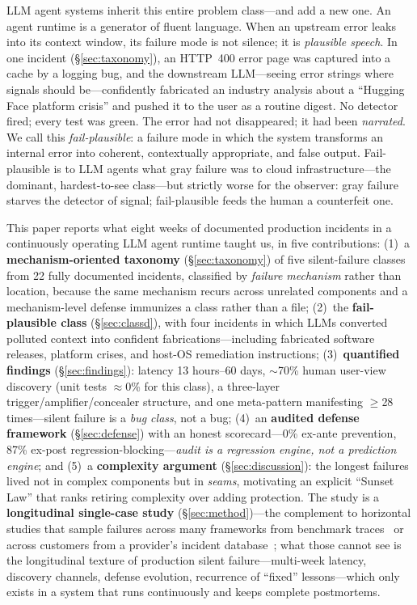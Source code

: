 \documentclass[conference]{IEEEtran}
\newcommand{\failplausible}{\emph{fail-plausible}}
\begin{document}
LLM agent systems inherit this entire problem class---and add a new one.
An agent runtime is a generator of fluent language. When an upstream
error leaks into its context window, its failure mode is not silence; it
is \emph{plausible speech}. In one incident (\S\ref{sec:taxonomy}), an
HTTP~400 error page was captured into a cache by a logging bug, and the
downstream LLM---seeing error strings where signals should be---confidently
fabricated an industry analysis about a ``Hugging Face platform crisis''
and pushed it to the user as a routine digest. No detector fired; every
test was green. The error had not disappeared; it had been
\emph{narrated}. We call this \failplausible: a failure mode in which the
system transforms an internal error into coherent, contextually
appropriate, and false output. Fail-plausible is to LLM agents what gray
failure was to cloud infrastructure---the dominant, hardest-to-see
class---but strictly worse for the observer: gray failure starves the
detector of signal; fail-plausible feeds the human a counterfeit one.

This paper reports what eight weeks of documented production incidents in
a continuously operating LLM agent runtime taught us, in five
contributions: (1)~a \textbf{mechanism-oriented taxonomy}
(\S\ref{sec:taxonomy}) of five silent-failure classes from 22 fully
documented incidents, classified by \emph{failure mechanism} rather than
location, because the same mechanism recurs across unrelated components
and a mechanism-level defense immunizes a class rather than a file;
(2)~the \textbf{fail-plausible class} (\S\ref{sec:classd}), with four
incidents in which LLMs converted polluted context into confident
fabrications---including fabricated software releases, platform crises,
and host-OS remediation instructions; (3)~\textbf{quantified findings}
(\S\ref{sec:findings}): latency 13 hours--60 days, $\sim$70\% human
user-view discovery (unit tests $\approx$0\% for this class), a
three-layer trigger/amplifier/concealer structure, and one meta-pattern
manifesting $\geq$28 times---silent failure is a \emph{bug class}, not a
bug; (4)~an \textbf{audited defense framework} (\S\ref{sec:defense}) with
an honest scorecard---0\% ex-ante prevention, 87\% ex-post
regression-blocking---\emph{audit is a regression engine, not a
prediction engine}; and (5)~a \textbf{complexity argument}
(\S\ref{sec:discussion}): the longest failures lived not in complex
components but in \emph{seams}, motivating an explicit ``Sunset Law'' that
ranks retiring complexity over adding protection. The study is a
\textbf{longitudinal single-case study} (\S\ref{sec:method})---the
complement to horizontal studies that sample failures across many
frameworks from benchmark traces~\cite{cemri2025mast} or across customers
from a provider's incident database~\cite{ranganathan2025inference}; what
those cannot see is the longitudinal texture of production silent
failure---multi-week latency, discovery channels, defense evolution,
recurrence of ``fixed'' lessons---which only exists in a system that runs
continuously and keeps complete postmortems.
\end{document}
